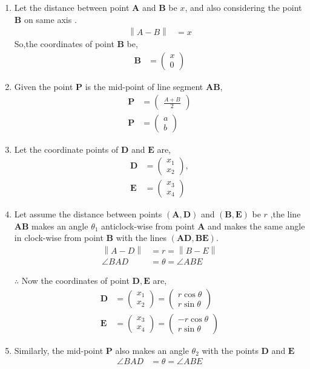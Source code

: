 \documentclass[11pt, a4paper]{article}
\newcommand{\myvec}[1]{\ensuremath{\begin{pmatrix}#1\end{pmatrix}}}
\let\vec\mathbf
\providecommand{\norm}[1]{\left\lVert#1\right\rVert}
\begin{document}
\begin{enumerate}
\begin{enumerate}[label=(\roman*)]
\item Let the distance between point $\vec{A}$ and $\vec{B}$ be $x$, and also considering the point $\vec{B}$ on same axis .
\begin{align}
	\norm{A-B} &= x
\end{align}
				So,the coordinates of point $\vec{B}$ be,
\begin{align}
\vec{B} &= \myvec{x \\ 0}
\end{align}

\item Given the point $\vec{P}$ is the mid-point of line segment $\vec{AB}$,
\begin{align}
	\vec{P} &= \myvec{\frac{A+B}{2}}\\
	\vec{P} &= \myvec{a \\ b}
\end{align}

\item Let the coordinate points of $\vec{D}$ and $\vec{E}$ are,
\begin{align}
\vec{D} &= \myvec{ x_1 \\ x_2},\\
\vec{E} &= \myvec{ x_3 \\ x_4}
\end{align}

\item Let assume the distance between points $\vec{(A, D)}$ and $\vec{(B, E)}$ be $r$ ,the line $\vec{AB}$ makes an angle $ \theta_1 $ anticlock-wise from point $\vec{A}$ and makes the same angle in clock-wise from point $\vec{B}$ with the lines $\vec{(AD, BE)}$.
\begin{align}
	\norm{A-D} &= r = \norm{B-E} \\
	\angle BAD &= \theta = \angle ABE
\end{align}

				$\therefore$ Now the coordinates of point $\vec{D, E}$ are,
\begin{align}
	\vec{D} &= \myvec{ x_1 \\ x_2 } = \myvec{r \cos \theta \\ r\sin \theta} \\
	\vec{E} &= \myvec{ x_3 \\ x_4 } = \myvec{-r \cos \theta \\ r \sin \theta} 
\end{align}

\item Similarly, the mid-point $\vec{P}$ also makes an angle $\theta_2$ with the points $\vec{D}$ and $\vec{E}$
	\begin{align}
		\angle BAD &= \theta = \angle ABE
	\end{align}


\end{enumerate}
\end{enumerate}
\end{document}
